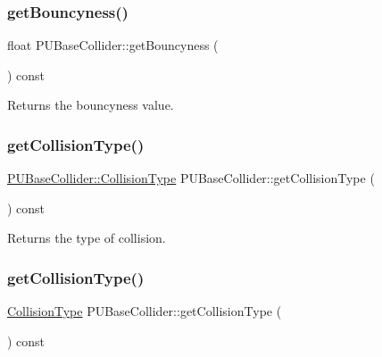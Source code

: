 \subsubsection{\texorpdfstring{get\+Bouncyness()}{getBouncyness()}\hspace{0.1cm}{\footnotesize\ttfamily [2/2]}}
{\footnotesize\ttfamily float P\+U\+Base\+Collider\+::get\+Bouncyness (\begin{DoxyParamCaption}{ }\end{DoxyParamCaption}) const}

Returns the bouncyness value. \mbox{\label{classPUBaseCollider_ad56efaa81e830e0173ab4135c62655c2}} 
\subsubsection{\texorpdfstring{get\+Collision\+Type()}{getCollisionType()}\hspace{0.1cm}{\footnotesize\ttfamily [1/2]}}
{\footnotesize\ttfamily \hyperlink{classPUBaseCollider_a13f646d7a12d1abb3cca3043c817e726}{P\+U\+Base\+Collider\+::\+Collision\+Type} P\+U\+Base\+Collider\+::get\+Collision\+Type (\begin{DoxyParamCaption}{ }\end{DoxyParamCaption}) const}

Returns the type of collision. \mbox{\label{classPUBaseCollider_aecd3811a3af6b530f9fc005784713235}} 
\subsubsection{\texorpdfstring{get\+Collision\+Type()}{getCollisionType()}\hspace{0.1cm}{\footnotesize\ttfamily [2/2]}}
{\footnotesize\ttfamily \hyperlink{classPUBaseCollider_a13f646d7a12d1abb3cca3043c817e726}{Collision\+Type} P\+U\+Base\+Collider\+::get\+Collision\+Type (\begin{DoxyParamCaption}{ }\end{DoxyParamCaption}) const}

